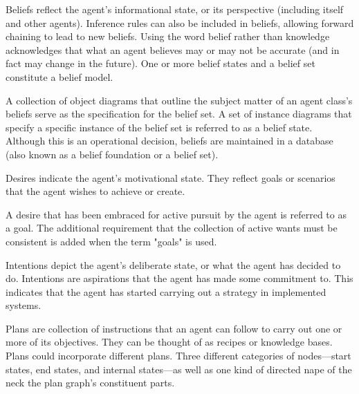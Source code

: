 \begin{itemize}
    Beliefs reflect the agent's informational state, or its perspective (including itself and other agents). Inference rules can also be included in beliefs, allowing forward chaining to lead to new beliefs. Using the word belief rather than knowledge acknowledges that what an agent believes may or may not be accurate (and in fact may change in the future). One or more belief states and a belief set constitute a belief model.
 
 \vspace{.5cm}
 
    \begin{itemize}[label={}]
        A collection of object diagrams that outline the subject matter of an agent class's beliefs serve as the specification for the belief set. A set of instance diagrams that specify a specific instance of the belief set is referred to as a belief state. Although this is an operational decision, beliefs are maintained in a database (also known as a belief foundation or a belief set).
    \end{itemize}
    
    \vspace{.5cm}
    
    Desires indicate the agent's motivational state. They reflect goals or scenarios that the agent wishes to achieve or create.
    
    \vspace{.5cm}
    
    \begin{itemize}[label={}]
        A desire that has been embraced for active pursuit by the agent is referred to as a goal. The additional requirement that the collection of active wants must be consistent is added when the term "goals" is used.
    \end{itemize}
    
    \vspace{.5cm}
    
    Intentions depict the agent's deliberate state, or what the agent has decided to do. Intentions are aspirations that the agent has made some commitment to. This indicates that the agent has started carrying out a strategy in implemented systems.
    
    \vspace{.5cm}
    
    \begin{itemize}[label={}]
        Plans are collection of instructions that an agent can follow to carry out one or more of its objectives. They can be thought of as recipes or knowledge bases. Plans could incorporate different plans. Three different categories of nodes—start states, end states, and internal states—as well as one kind of directed nape of the neck the plan graph's constituent parts.
        

\end{itemize}
\end{itemize}
